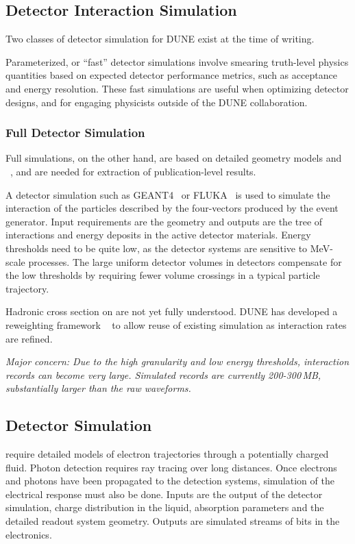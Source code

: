 \documentclass[../main-v1.tex]{subfiles}
\begin{document}
\subsection{Detector Interaction Simulation}

Two classes of detector simulation for DUNE exist at the time of writing. 

Parameterized, or ``fast'' detector simulations involve smearing truth-level physics quantities based on expected detector performance metrics, such as acceptance and energy resolution.  These fast simulations are useful when optimizing detector designs, and for engaging physicists outside of the DUNE collaboration.  

\subsubsection{Full Detector Simulation} 
Full simulations, on the other hand, are based on detailed geometry models and ~\cite{Agostinelli:2002hh,Allison:2016lfl}, and are needed for extraction of publication-level results.

A detector simulation such as GEANT4~\cite{Allison:2016lfl} or FLUKA~\cite{Bohlen:2014buj} is used to simulate the interaction of the particles described by the four-vectors produced by the event generator. Input requirements are the geometry and outputs are the tree of interactions and energy deposits in the active detector materials. 
Energy thresholds need to be quite low, as the detector systems are sensitive to MeV-scale processes. The large uniform detector volumes in  detectors compensate for the low thresholds by requiring fewer volume crossings in a typical particle trajectory.  

Hadronic cross section on  are not yet fully understood.  DUNE has developed a reweighting framework 
~\cite{Calcutt:2021zck} to allow reuse of existing simulation as interaction rates are refined.

{\it Major concern: Due to the high granularity and low energy thresholds, interaction records can become very large. Simulated  records are currently 200-300\,MB, substantially larger than the raw waveforms.}

\subsection{Detector Simulation}
 require detailed models of electron trajectories through a potentially charged fluid.  Photon detection requires ray tracing over long distances.  Once electrons and photons have been propagated to the detection systems, simulation of the electrical response must also be done. Inputs are the output of the detector simulation, charge distribution in the liquid, absorption parameters and the detailed readout system geometry. Outputs are simulated streams of bits in the electronics. 
\end{document}
